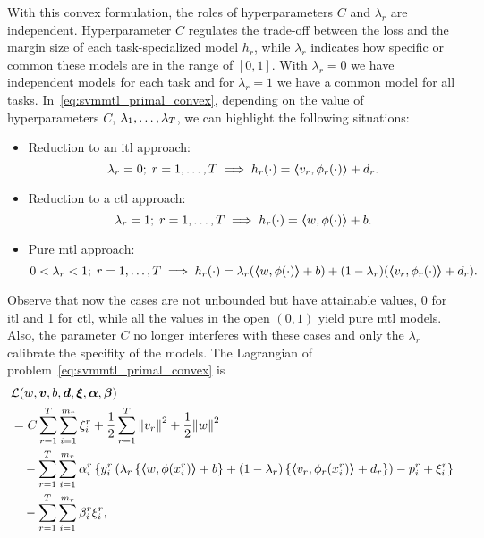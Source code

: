 With this convex formulation, the roles of hyperparameters $C$ and $\lambda_r$ are independent. Hyperparameter $C$ regulates the trade-off between the loss and the margin size of each task-specialized model $h_r$, while $\lambda_r$ indicates how specific or common these models are in the range of $[0, 1]$. With $\lambda_r=0$ we have independent models for each task and for $\lambda_r=1$ we have a common model for all tasks. 
%
In~\eqref{eq:svmmtl_primal_convex}, depending on the value of hyperparameters $C$, $\lambda_1, \ldots, \lambda_T$, we can highlight the following situations:
%
\begin{itemize}
    \item Reduction to an \acrshort{itl} approach:
    $$\lambda_r = 0 ;\; r=1, \ldots, T \implies h_r(\cdot) = \bm{\left\langle} {v}_r, \phi_r(\cdot) \bm{\right\rangle} + d_r .$$
    \item Reduction to a \acrshort{ctl} approach: 
    $$ \lambda_r = 1 ;\; r=1, \ldots, T \implies h_r(\cdot) = \bm{\left\langle} w, \phi(\cdot) \bm{\right\rangle} + b .$$
    \item Pure \acrshort{mtl} approach:
    $$ 0 < \lambda_r < 1 ;\; r=1, \ldots, T \implies h_r(\cdot) = \lambda_r (\bm{\left\langle} w, \phi(\cdot) \bm{\right\rangle} + b ) + (1 - \lambda_r) (\bm{\left\langle} {v}_r, \phi_r(\cdot) \bm{\right\rangle} + d_r) .$$
\end{itemize}
Observe that now the cases are not unbounded but have attainable values, 0 for \acrshort{itl} and 1 for \acrshort{ctl}, while all the values in the open $(0, 1)$ yield pure \acrshort{mtl} models. Also, the parameter $C$ no longer interferes with these cases and only the $\lambda_r$ calibrate the specifity of the models.
 The Lagrangian of problem~\eqref{eq:svmmtl_primal_convex} is
\begin{equation}\label{eq:svmmtl_lagrangian_convex}
    \begin{aligned}
        & \lagr({w}, \fv{v}, b, \fv{d}, \fv{\xi}, \fv{\alpha}, \fv{\beta}) \\
        &=  C \sum_{r= 1}^T \sum_{i=1}^{m_r} {\xi_{i}^r} + \frac{1}{2} \sum_{r= 1}^T{\norm{{v}_r}^2} + \frac{1}{2} {\norm{{w}}}^2 \\
        &\quad -  \sum_{r= 1}^T \sum_{i=1}^{m_r} \alpha_i^r \left\lbrace y_{i}^r  \left(\lambda_r \left\lbrace \dotp{w}{\phi(x_{i}^r)} + b  \right\rbrace + (1 - \lambda_r) \left\lbrace \dotp{{v}_r}{\phi_r(x_{i}^r)} + d_r \right\rbrace  \right) - p_{i}^r + \xi_{i}^r  \right\rbrace \\
        &\quad -  \sum_{r= 1}^T \sum_{i=1}^{m_r} \beta_i^r \xi_i^r ,
    \end{aligned}
\end{equation}
